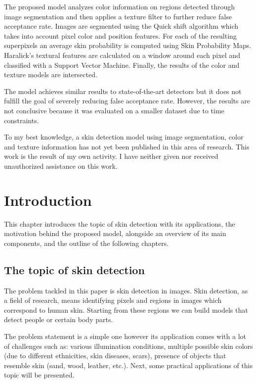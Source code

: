 \documentclass[12pt]{report}
\begin{document}
	The proposed model analyzes color information on regions detected through image segmentation and then applies a texture filter to further reduce false acceptance rate. Images are segmented using the Quick shift algorithm which takes into account pixel color and position features. For each of the resulting superpixels an average skin probability is computed using Skin Probability Maps. Haralick's textural features are calculated on a window around each pixel and classified with a Support Vector Machine. Finally, the results of the color and texture models are intersected. 
	
	The model achieves similar results to state-of-the-art detectors but it does not fulfill the goal of severely reducing false acceptance rate. However, the results are not conclusive because it was evaluated on a smaller dataset due to time constraints.
	
	To my best knowledge, a skin detection model using image segmentation, color and texture information has not yet been published in this area of research. This work is the result of my own activity. I have neither given nor received unauthorized assistance on this work.
	
	
	\tableofcontents
	\listoffigures
	\listoftables
	\newpage
	
	
	\chapter{Introduction}
	
	This chapter introduces the topic of skin detection with its applications, the motivation behind the proposed model, alongside an overview of its main components, and the outline of the following chapters.
	
	\section{The topic of skin detection}
	The problem tackled in this paper is skin detection in images. Skin detection, as a field of research,  means identifying pixels and regions in images which correspond to human skin. Starting from these regions we can build models that detect people or certain body parts. 
	
	The problem statement is a simple one however its application comes with a lot of challenges such as: various illumination conditions, multiple possible skin colors (due to different ethnicities, skin diseases, scars), presence of objects that resemble skin (sand, wood, leather, etc.). Next, some practical applications of this topic will be presented.
	
\end{document}
